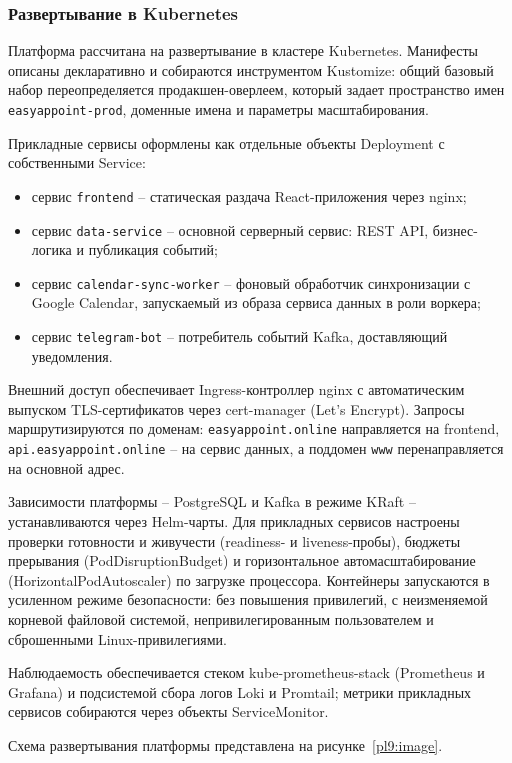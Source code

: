 \subsubsection{Развертывание в Kubernetes}

Платформа рассчитана на развертывание в кластере Kubernetes. Манифесты описаны декларативно и собираются инструментом Kustomize: общий базовый набор переопределяется продакшен-оверлеем, который задает пространство имен \texttt{easyappoint-prod}, доменные имена и параметры масштабирования.

Прикладные сервисы оформлены как отдельные объекты Deployment с собственными Service:
\begin{itemize}
\item сервис \texttt{frontend} -- статическая раздача React-приложения через nginx;
\item сервис \texttt{data-service} -- основной серверный сервис: REST API, бизнес-логика и публикация событий;
\item сервис \texttt{calendar-sync-worker} -- фоновый обработчик синхронизации с Google Calendar, запускаемый из образа сервиса данных в роли воркера;
\item сервис \texttt{telegram-bot} -- потребитель событий Kafka, доставляющий уведомления.
\end{itemize}

Внешний доступ обеспечивает Ingress-контроллер nginx с автоматическим выпуском TLS-сертификатов через cert-manager (Let's Encrypt). Запросы маршрутизируются по доменам: \texttt{easyappoint.online} направляется на frontend, \texttt{api.easyappoint.online} -- на сервис данных, а поддомен \texttt{www} перенаправляется на основной адрес.

Зависимости платформы -- PostgreSQL и Kafka в режиме KRaft -- устанавливаются через Helm-чарты. Для прикладных сервисов настроены проверки готовности и живучести (readiness- и liveness-пробы), бюджеты прерывания (PodDisruptionBudget) и горизонтальное автомасштабирование (HorizontalPodAutoscaler) по загрузке процессора. Контейнеры запускаются в усиленном режиме безопасности: без повышения привилегий, с неизменяемой корневой файловой системой, непривилегированным пользователем и сброшенными Linux-привилегиями.

Наблюдаемость обеспечивается стеком kube-prometheus-stack (Prometheus и Grafana) и подсистемой сбора логов Loki и Promtail; метрики прикладных сервисов собираются через объекты ServiceMonitor.

Схема развертывания платформы представлена на рисунке~\ref{pl9:image}.

